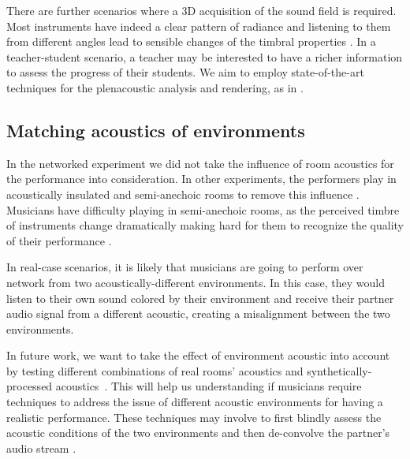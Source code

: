 \documentclass[conference]{IEEEtran}
\begin{document}
There are further scenarios where a 3D acquisition of the sound field is required.  Most instruments have indeed a clear pattern of radiance and listening to them from different angles lead to sensible changes of the timbral properties \cite{CancliniAES}. In a teacher-student scenario, a teacher may be interested to have a richer information to assess the progress of their students. We aim to employ state-of-the-art techniques for the plenacoustic analysis and rendering, as in \cite{Canclini2015}.


\subsection{Matching acoustics of environments}
In the networked experiment we did not take the influence of room acoustics for the performance into consideration. In other experiments, the performers play in acoustically insulated and semi-anechoic rooms to remove this influence \cite{RottondiFeature}. Musicians have difficulty playing in semi-anechoic rooms, as the perceived timbre of instruments change dramatically making hard for them to recognize the quality of their performance \cite{Woszczyk2009}.

In real-case scenarios, it is likely that musicians are going to perform over network from two acoustically-different environments. In this case, they would listen to their own sound colored by their environment and receive their partner audio signal from a different acoustic, creating a misalignment between the two environments.

In future work, we want to take the effect of environment acoustic into account by testing different combinations of real rooms' acoustics and synthetically-processed acoustics~\cite{Boucher15}. This will help us understanding if musicians require techniques to address the issue of different acoustic environments for having a realistic performance. These techniques may involve to first blindly assess the acoustic conditions of the two environments and then de-convolve the partner's audio stream \cite{CancliniRoom}.
\end{document}
